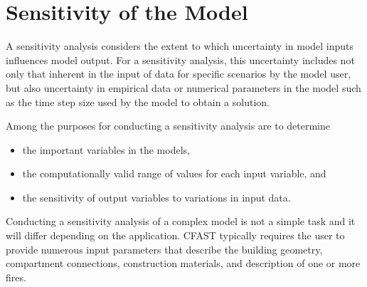 \chapter{Sensitivity of the Model}

A sensitivity analysis considers the extent to which uncertainty in model inputs influences model 
output.  For a sensitivity analysis, this uncertainty includes not only that inherent in the input of 
data for specific scenarios by the model user, but also uncertainty in empirical data or numerical 
parameters in the model such as the time step size used by the model to obtain a solution. 

Among the purposes for conducting a sensitivity analysis are to determine 
\begin{itemize}
\item the important variables in the models, 
\item the computationally valid range of values for each input variable, and 
\item the sensitivity of output variables to variations in input data. 
\end{itemize}

Conducting a sensitivity analysis of a complex model is not a simple task and it will differ 
depending on the application. CFAST typically requires the user to provide numerous input 
parameters that describe the building geometry, compartment connections, construction 
materials, and description of one or more fires. 